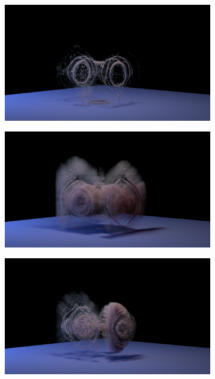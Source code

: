 \documentclass[11pt]{article}
\begin{document}
\begin{figure}
	\begin{subfigure}[h]{0.5\textwidth}
		\centering
		\includegraphics[width=\textwidth]{Figures/modes/plume0000.png}
	\end{subfigure}
	\begin{subfigure}[h]{0.5\textwidth}
		\centering
		\includegraphics[width=\textwidth]{Figures/modes/plume0001.png}	
	\end{subfigure}
	\begin{subfigure}[h]{0.5\textwidth}
		\centering
		\includegraphics[width=\textwidth]{Figures/modes/plume0002.png}

\end{subfigure}
\end{figure}
\end{document}
